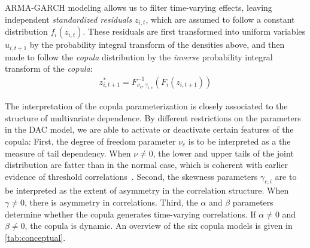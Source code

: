 ARMA-GARCH modeling allows us to filter time-varying effects, leaving independent \emph{standardized residuals} $z_{i,t}$, which are assumed to follow a constant distribution $f_i(z_{i,t})$. These residuals are first transformed into uniform variables $u_{i,t+1}$ by the probability integral transform of the densities above, and then made to follow the \emph{copula} distribution by the \emph{inverse} probability integral transform of the \emph{copula}:
\begin{align}
  z_{i,t+1}^* = F^{-1}_{\nu_c,\gamma_{i,c}}(F_{i}(z_{i,t+1}))
\end{align}

The interpretation of the copula parameterization is closely associated to the structure of multivariate dependence. By different restrictions on the parameters in the DAC model, we are able to activate or deactivate certain features of the copula: First, the degree of freedom parameter $\nu_c$ is to be interpreted as a the measure of tail dependency. When $\nu \neq 0$, the lower and upper tails of the joint distribution are fatter than in the normal case, which is coherent with earlier evidence of threshold correlations~\autocite{ChristoffersenLanglois2013}. Second, the skewness parameters $\gamma_{c,i}$ are to be interpreted as the extent of asymmetry in the correlation structure. When $\gamma \neq 0$, there is asymmetry in correlations. Third, the $\alpha$ and $\beta$ parameters determine whether the copula generates time-varying correlations. If $\alpha \neq 0$ and $\beta \neq 0$, the copula is dynamic. An overview of the six copula models is given in \autoref{tab:conceptual}.





